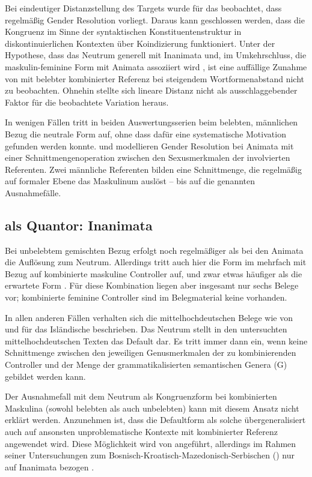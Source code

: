 Bei eindeutiger Distanzstellung des Targets wurde für das \CAO{} beobachtet,
dass regel\-mäßig Gender Re\-solu\-tion vorliegt. Daraus kann geschlossen
werden, dass die Kongruenz im Sinne der syntaktischen Konstituentenstruktur in
diskontinuierlichen Kontexten über Koindizierung funktioniert. Unter der
Hypothese, dass das Neutrum generell mit Inanimata und, im Umkehrschluss, die
maskulin-feminine Form mit Animata assoziiert wird
\autocite[243--245]{askedal1973}, ist eine auffällige Zunahme von 
mit belebter kombinierter Referenz bei steigendem Wortformenabstand nicht zu
beobachten. Ohnehin stellte sich lineare Distanz nicht als ausschlaggebender
Faktor für die beob\-ach\-tete Variation heraus.

In wenigen Fällen tritt in beiden Auswertungs\-serien beim belebten, männlichen
Bezug die neutrale Form auf, ohne dass dafür eine systematische Motivation
gefunden werden konnte. \citet{wechslerzlatic2003} und \citet{wechsler2009}
modellieren Gender Resolution bei Animata mit einer Schnittmengenoperation
zwischen den Sexusmerkmalen der involvierten Referenten. Zwei männliche
Referenten bilden eine Schnittmenge, die regelmäßig auf formaler Ebene das
Maskulinum auslöst -- bis auf die genannten Ausnahmefälle.

\subsection{ als Quantor: Inanimata}

Bei unbelebtem gemischten Bezug erfolgt noch regelmäßiger als bei den Animata
die Auflösung zum Neutrum. Allerdings tritt auch hier die Form  im
\CAO{} mehrfach mit Bezug auf kombinierte maskuline Controller auf, und zwar
etwas häufiger als die erwartete Form . Für diese Kombination
liegen aber insgesamt nur sechs Belege vor; kombinierte feminine Controller
sind im Belegmaterial keine vorhanden.

In allen anderen Fällen verhalten sich die
mittelhochdeutschen Belege wie von
\citet{wechslerzlatic2003} und \citet{wechsler2009} für das
Isländische beschrieben. Das Neutrum stellt in den untersuchten
mittelhochdeutschen Texten das Default dar. Es tritt
immer dann ein, wenn keine Schnittmenge zwischen den jeweiligen Genusmerkmalen
der zu kombinierenden Controller und der Menge der grammatikalisierten
semantischen Genera (G) gebildet werden kann.

Der Ausnahmefall mit dem Neutrum als Kongruenzform bei kombinierten Maskulina
(sowohl belebten als auch unbelebten) kann mit diesem Ansatz nicht erklärt
werden. Anzunehmen ist, dass die Defaultform als solche übergeneralisiert auch
auf ansonsten unproblematische Kontexte mit kombinierter Referenz angewendet
wird. Diese Möglichkeit wird von \citet[302]{corbett1991} angeführt, allerdings
im Rahmen seiner Untersuchungen zum
Bosnisch-\allowbreak{}Kroatisch-\allowbreak{}Mazedonisch-\allowbreak{}Serbischen
() nur auf Inanimata bezogen
\autocites[vgl.~auch][190]{wechslerzlatic2003}[581]{wechsler2009}.

